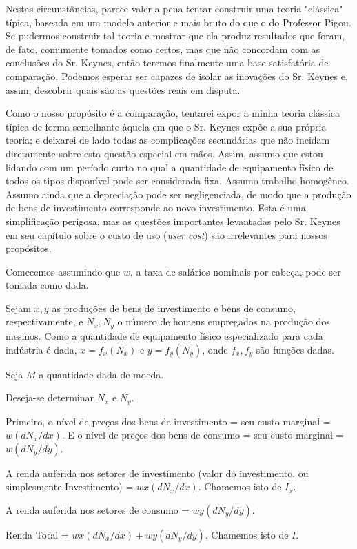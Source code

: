 \documentclass[12pt]{article}
\begin{document}
Nestas circunstâncias, parece valer a pena tentar construir uma teoria "clássica" típica, baseada em um modelo anterior e mais bruto do que o do Professor Pigou. Se pudermos construir tal teoria e mostrar que ela produz resultados que foram, de fato, comumente tomados como certos, mas que não concordam com as conclusões do Sr. Keynes, então teremos finalmente uma base satisfatória de comparação. Podemos esperar ser capazes de isolar as inovações do Sr. Keynes e, assim, descobrir quais são as questões reais em disputa.

Como o nosso propósito é a comparação, tentarei expor a minha teoria clássica típica de forma semelhante àquela em que o Sr. Keynes expõe a sua própria teoria; e deixarei de lado todas as complicações secundárias que não incidam diretamente sobre esta questão especial em mãos. Assim, assumo que estou lidando com um período curto no qual a quantidade de equipamento físico de todos os tipos disponível pode ser considerada fixa. Assumo trabalho homogêneo. Assumo ainda que a depreciação pode ser negligenciada, de modo que a produção de bens de investimento corresponde ao novo investimento. Esta é uma simplificação perigosa, mas as questões importantes levantadas pelo Sr. Keynes em seu capítulo sobre o custo de uso (\textit{user cost}) são irrelevantes para nossos propósitos.

Comecemos assumindo que $w$, a taxa de salários nominais por cabeça, pode ser tomada como dada.

Sejam $x, y$ as produções de bens de investimento e bens de consumo, respectivamente, e $N_x, N_y$ o número de homens empregados na produção dos mesmos. Como a quantidade de equipamento físico especializado para cada indústria é dada, $x = f_x(N_x)$ e $y = f_y(N_y)$, onde $f_x, f_y$ são funções dadas.

Seja $M$ a quantidade dada de moeda.

Deseja-se determinar $N_x$ e $N_y$.

Primeiro, o nível de preços dos bens de investimento = seu custo marginal = $w(dN_x/dx)$. E o nível de preços dos bens de consumo = seu custo marginal = $w(dN_y/dy)$.

A renda auferida nos setores de investimento (valor do investimento, ou simplesmente Investimento) = $wx(dN_x/dx)$. Chamemos isto de $I_x$.

A renda auferida nos setores de consumo = $wy(dN_y/dy)$.

Renda Total = $wx(dN_x/dx) + wy(dN_y/dy)$. Chamemos isto de $I$.
\end{document}
